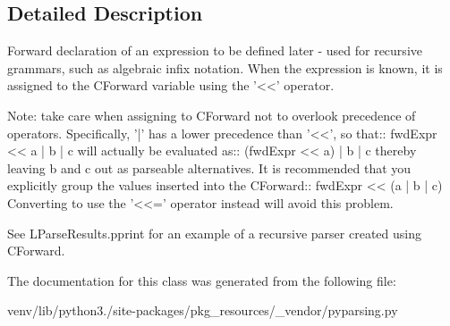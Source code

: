 \subsection{Detailed Description}
\begin{DoxyVerb}Forward declaration of an expression to be defined later -
used for recursive grammars, such as algebraic infix notation.
When the expression is known, it is assigned to the C{Forward} variable using the '<<' operator.

Note: take care when assigning to C{Forward} not to overlook precedence of operators.
Specifically, '|' has a lower precedence than '<<', so that::
    fwdExpr << a | b | c
will actually be evaluated as::
    (fwdExpr << a) | b | c
thereby leaving b and c out as parseable alternatives.  It is recommended that you
explicitly group the values inserted into the C{Forward}::
    fwdExpr << (a | b | c)
Converting to use the '<<=' operator instead will avoid this problem.

See L{ParseResults.pprint} for an example of a recursive parser created using
C{Forward}.
\end{DoxyVerb}
 

The documentation for this class was generated from the following file\+:\begin{DoxyCompactItemize}
\item 
venv/lib/python3./site-\/packages/pkg\+\_\+resources/\+\_\+vendor/pyparsing.\+py\end{DoxyCompactItemize}
